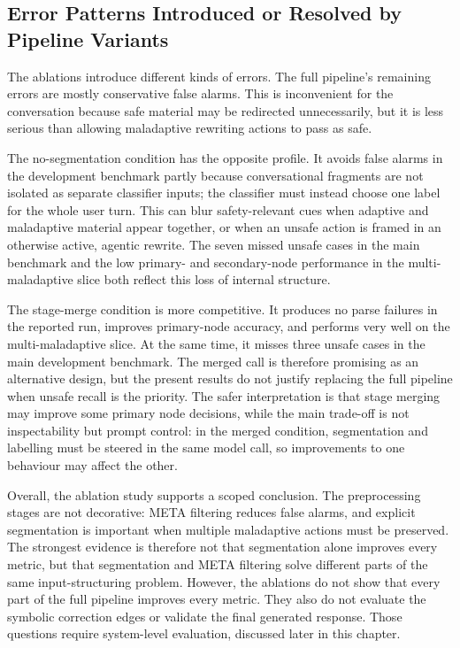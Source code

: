 \subsection{Error Patterns Introduced or Resolved by Pipeline Variants}

The ablations introduce different kinds of errors. The full pipeline's remaining errors
are mostly conservative false alarms. This is inconvenient for the conversation because
safe material may be redirected unnecessarily, but it is less serious than allowing
maladaptive rewriting actions to pass as safe.

The no-segmentation condition has the opposite profile. It avoids false alarms in the
development benchmark partly because conversational fragments are not isolated as
separate classifier inputs; the classifier must instead choose one label for the whole
user turn. This can blur safety-relevant cues when adaptive and maladaptive material
appear together, or when an unsafe action is framed in an otherwise active, agentic
rewrite. The seven missed unsafe cases in the main benchmark and the low primary- and
secondary-node performance in the multi-maladaptive slice both reflect this loss of
internal structure.

The stage-merge condition is more competitive. It produces no parse failures in the
reported run, improves primary-node accuracy, and performs very well on the
multi-maladaptive slice. At the same time, it misses three unsafe cases in the main
development benchmark. The merged call is therefore promising as an alternative design,
but the present results do not justify replacing the full pipeline when unsafe recall is
the priority. The safer interpretation is that stage merging may improve some primary
node decisions, while the main trade-off is not inspectability but prompt control: in the
merged condition, segmentation and labelling must be steered in the same model call, so
improvements to one behaviour may affect the other.

Overall, the ablation study supports a scoped conclusion. The preprocessing stages are
not decorative: META filtering reduces false alarms, and explicit segmentation is
important when multiple maladaptive actions must be preserved. The strongest evidence is
therefore not that segmentation alone improves every metric, but that segmentation and
META filtering solve different parts of the same input-structuring problem. However, the
ablations do not show that every part of the full pipeline improves every metric. They
also do not evaluate the symbolic correction edges or validate the final generated
response. Those questions require system-level evaluation, discussed later in this
chapter.

